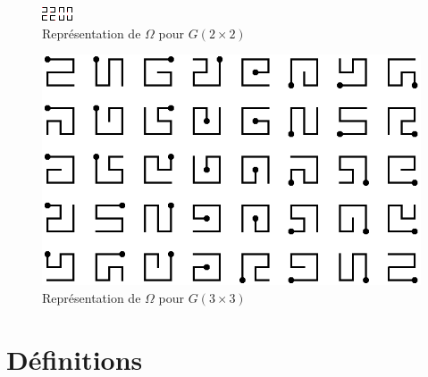 \documentclass[twoside, a4paper, 12pt]{report}
\begin{document}
\begin{figure}[h]
\centering\includegraphics[scale=5]{graphes_2x2.png}
\caption{Représentation de $\Omega$ pour $G(2\times2)$}
\label{parcours_c2}
\end{figure}

\begin{figure}[h]
\centering\includegraphics[scale=0.8]{Serpent.png}
\caption{Représentation de $\Omega$ pour  $G(3\times3)$}
\label{parcours_c3}
\end{figure}

\section{Définitions}
\end{document}
